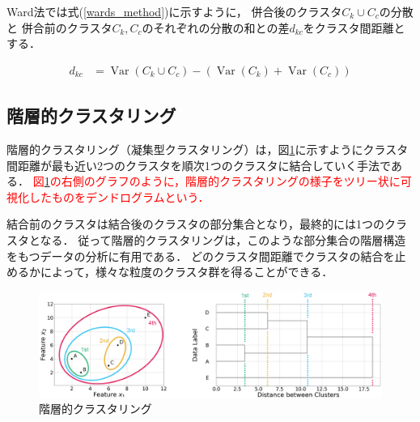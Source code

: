 \documentclass[12pt,a4j]{jreport}
\begin{document}
Ward法では式(\ref{wards_method})に示すように，
併合後のクラスタ$C_{k} \cup C_{c}$の分散と
併合前のクラスタ$C_{k}, C_{c}$のそれぞれの分散の和との差$d_{k c}$をクラスタ間距離とする．


\begin{align}
  d_{k c} &= \operatorname{Var} \left( C_{k} \cup C_{c} \right)
  -
  \left(
    \operatorname{Var}\left(C_{k}\right)
    +
    \operatorname{Var}\left(C_{c}\right)
  \right)
  \label{wards_method}
\end{align}



\subsection{階層的クラスタリング}
\label{subsection_hierarchical_clustering}
階層的クラスタリング（凝集型クラスタリング）は，図\ref{fig_clustering_example}に示すようにクラスタ間距離が最も近い2つのクラスタを順次1つのクラスタに結合していく手法である．
\textcolor{red}{
図\ref{fig_clustering_example}の右側のグラフのように，階層的クラスタリングの様子をツリー状に可視化したものをデンドログラムという．
}

結合前のクラスタは結合後のクラスタの部分集合となり，最終的には1つのクラスタとなる．
従って階層的クラスタリングは，このような部分集合の階層構造をもつデータの分析に有用である．
どのクラスタ間距離でクラスタの結合を止めるかによって，様々な粒度のクラスタ群を得ることができる．

\begin{figure}[H]
	\centering
	\includegraphics[keepaspectratio, width=120mm]{img/clustering_example.png}
	\caption{階層的クラスタリング}
	\label{fig_clustering_example}
\end{figure}
\end{document}
